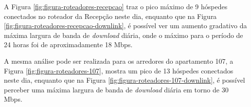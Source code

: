         \begin{figure}[!h]
    	\end{figure}
    	
A Figura \ref{fig:figura-roteadores-recepcao} traz o pico máximo de 9 hóspedes conectados no roteador da Recepção neste dia, enquanto que na Figura \ref{fig:figura-roteadores-recepcao-downlink}, é possível ver um aumento gradativo da máxima largura de banda de \textit{download} diária, onde o máximo para o período de 24 horas foi de aproximadamente 18 Mbps.

        \begin{figure}[!h]
    	\end{figure}
    	
A mesma análise pode ser realizada para os arredores do apartamento 107, a Figura \ref{fig:figura-roteadores-107}, mostra um pico de 13 hóspedes conectados neste dia, enquanto que na Figura \ref{fig:figura-roteadores-107-downlink}, é possível perceber uma máxima largura de banda de \textit{download} diária em torno de 30 Mbps.

        \begin{figure}[!h]
    	\end{figure}